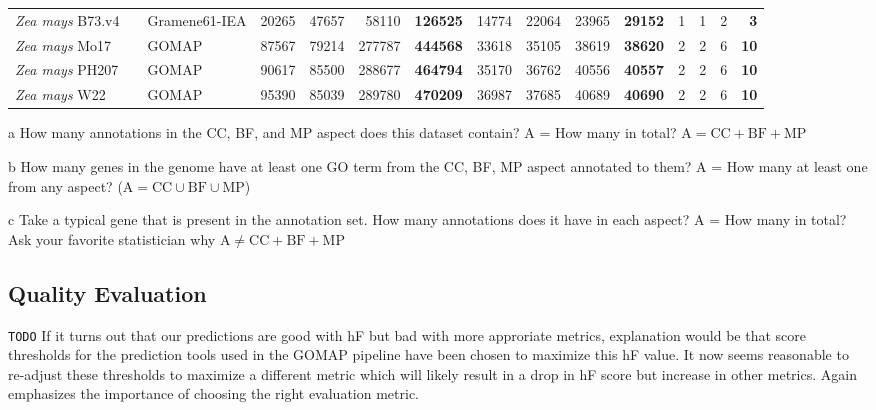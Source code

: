 \documentclass[utf8]{frontiersSCNS}
\begin{document}
\begin{table}[t]
{\begin{threeparttable}
\begin{tabular}{lrlrrr>{\bfseries}r|rrr>{\bfseries}r|rrr>{\bfseries}r}
\multirow{-3}{*}{\raggedright\arraybackslash \textit{Zea mays} B73.v4} &  & Gramene61-IEA & 20265 & 47657 & 58110 & 126525 & 14774 & 22064 & 23965 & 29152 & 1 & 1 & 2 & 3\\

\rowcolor{gray!6}  \textit{Zea mays} Mo17 &  & GOMAP & 87567 & 79214 & 277787 & 444568 & 33618 & 35105 & 38619 & 38620 & 2 & 2 & 6 & 10\\

\textit{Zea mays} PH207 &  & GOMAP & 90617 & 85500 & 288677 & 464794 & 35170 & 36762 & 40556 & 40557 & 2 & 2 & 6 & 10\\

\rowcolor{gray!6}  \textit{Zea mays} W22 & \multirow{-25}{*}{\raggedleft\arraybackslash 100} & GOMAP & 95390 & 85039 & 289780 & 470209 & 36987 & 37685 & 40689 & 40690 & 2 & 2 & 6 & 10\\
\bottomrule
\end{tabular}
\begin{tablenotes}
\item[a] How many annotations in the CC, BF, and MP aspect does this dataset contain? A = How many in total? $\textrm{A} = \textrm{CC} + \textrm{BF} + \textrm{MP}$
\item[b] How many genes in the genome have at least one GO term from the CC, BF, MP aspect annotated to them? A = How many at least one from any aspect? ($\textrm{A} = \textrm{CC} \cup \textrm{BF} \cup \textrm{MP}$)
\item[c] Take a typical gene that is present in the annotation set. How many annotations does it have in each aspect? A = How many in total? Ask your favorite statistician why $\textrm{A} \neq \textrm{CC} + \textrm{BF} +\textrm{MP}$
\end{tablenotes}
\end{threeparttable}}
\end{table}

\hypertarget{quality-evaluation}{%
\subsection{Quality Evaluation}\label{quality-evaluation}}

\texttt{TODO} If it turns out that our predictions are good with hF but bad with more approriate metrics, explanation would be that score thresholds for the prediction tools used in the GOMAP pipeline have been chosen to maximize this hF value. It now seems reasonable to re-adjust these thresholds to maximize a different metric which will likely result in a drop in hF score but increase in other metrics. Again emphasizes the importance of choosing the right evaluation metric.
\end{document}
